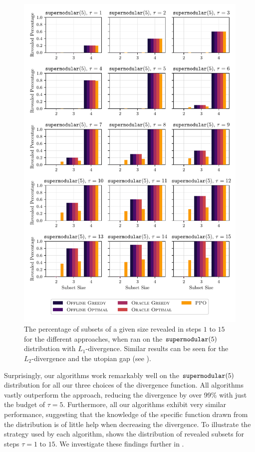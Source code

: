 \begin{figure}[t!]
  \centering
	\includegraphics[width=\textwidth]{figures/l1_norm_convex5_coalition_bar_sizes.pdf}
	\caption{ The percentage of subsets of a given size revealed in steps $1 $ to $ 15$ for the different approaches, when ran on the $\supermodular[5]$ distribution with $L_1$-divergence.
	  Similar results can be seen for the $ L_2 $-divergence and the utopian gap (see ). }
	\label{fig:supermod_coals}
\end{figure}

Surprisingly, our algorithms work remarkably well on the $ \supermodular[5] $ distribution for all our three choices of the divergence function.
All algorithms vastly outperform the \algRand{} approach, reducing the divergence by over 99\% with just the budget of $ \tau = 5 $.
Furthermore, all our algorithms exhibit very similar performance, suggesting that the knowledge of the specific function drawn from the distribution is of little help when decreasing the divergence.
To illustrate the strategy used by each algorithm,  shows the distribution of revealed subsets for steps $\tau= 1 $ to $ 15 $.
We investigate these findings further in .

